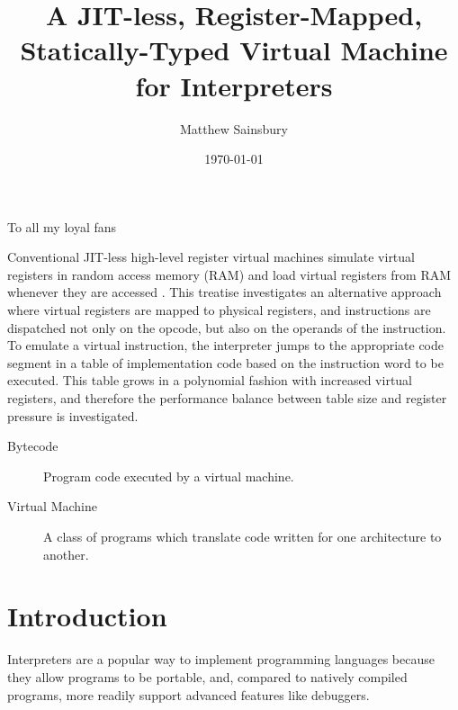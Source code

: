 



\title{A JIT-less, Register-Mapped, Statically-Typed Virtual Machine for Interpreters}
\author{Matthew Sainsbury}
\date{\today}

\begin{titlepage}

		\maketitle
	
\end{titlepage}


	To all my loyal fans

	Conventional JIT-less high-level register virtual machines simulate virtual registers in random access memory (RAM) and load virtual registers from RAM whenever they are accessed \citep{caseregistervm}. This treatise investigates an alternative approach where virtual registers are mapped to physical registers, and instructions are dispatched not only on the opcode, but also on the operands of the instruction. To emulate a virtual instruction, the interpreter jumps to the appropriate code segment in a table of implementation code based on the instruction word to be executed. This table grows in a polynomial fashion with increased virtual registers, and therefore the performance balance between table size and register pressure is investigated.



\tableofcontents

\begin{description}
	\item[Bytecode] Program code executed by a virtual machine.
	\item[Virtual Machine] A class of programs which translate code written for one architecture to another.
\end{description}


\chapter{Introduction}
	\startrealnumbers
	Interpreters are a popular way to implement programming languages because they allow programs to be portable, and, compared to natively compiled programs, more readily support advanced features like debuggers. 
	
